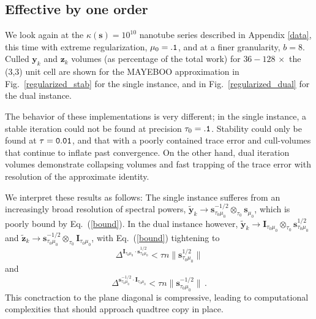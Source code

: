 \documentclass[letterpaper,twocolumn,amsmath,amsfont,amssymb,english,aps,jcp,preprintnumbers,groupaddress,nofootinbib,tightenlines,floatfix]{revtex4}
\newcommand{\mat}[1]{\boldsymbol{#1}}
\newcommand{\oto}{ {\scriptstyle \otimes}_{ \! \tau_0 } }
\theoremstyle{plain}
\theoremstyle{remark}
\theoremstyle{plain}
\begin{document}
\subsection{Effective by one order}

We look again at the $\kappa(\mat{s})=10^{10}$ nanotube series described in Appendix \ref{data},
this time with extreme regularization, $\mu_0={\tt .1}$, and at a finer granularity, $b=8$.
Culled $\mat{y}_k$ and $\mat{z}_k$ volumes (as percentage of the total work) for $36 - 128 \, \times$ the (3,3) unit cell
are shown for the MAYEBOO approximation in Fig.~\ref{regularized_stab} for the single instance, 
and in Fig.~\ref{regularized_dual} for the dual instance. 

The behavior of these implementations  is very different; in the single 
instance, a stable  iteration could not be found at precision $\tau_0=\tt .1$.  Stability could 
only be found at $\tau={\tt 0.01}$, and that with a poorly contained trace error and cull-volumes 
that continue to inflate past convergence.  On the other hand, dual iteration volumes demonstrate
collapsing volumes and fast trapping of the trace error with resolution of the approximate identity.

We interpret these results as follows: The single instance sufferes from an increasingly broad resolution of spectral powers,
$\widetilde{\mat{y}}_k \rightarrow  \mat{s}^{-1/2}_{\tau_0 \mu_0} \oto \mat{s}_{\mu_0}$, which is  poorly bound by Eq.~(\ref{bound}). 
In the dual instance however, $\widetilde{\mat{y}}_k\rightarrow  \mat{I}_{\tau_0 \mu_0} \oto \mat{s}^{1/2}_{\tau_0 \mu_0}$
and $\widetilde{\mat{z}}_k \rightarrow  \mat{s}^{-1/2}_{\tau_0 \mu_0} \oto \mat{I}_{\tau_0 \mu_0}$, 
with Eq.~(\ref{bound}) tightening to
\begin{equation}\label{boundY}
\Delta^{\mat{I}_{\tau_0 \mu_0} \cdot \mat{s}^{1/2}_{\tau_0 \mu_0}} <  \tau n \lVert \mat{s}^{1/2}_{\tau_0 \mu_0} \rVert
\end{equation}
and 
\begin{equation}\label{boundZ}
\Delta^{ \mat{s}^{-1/2}_{\tau_0 \mu_0}\cdot \mat{I}_{\tau_0 \mu_0}}  <  \tau n \lVert \mat{s}^{-1/2}_{\tau_0 \mu_0} \rVert \, .
\end{equation}
This conctraction to the plane diagonal is compressive, leading to computational complexities that should approach quadtree copy in place.   
\end{document}
